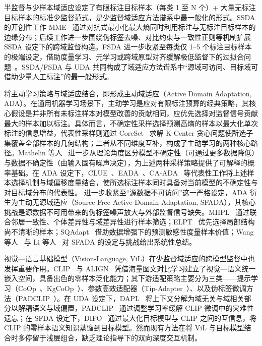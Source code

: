 半监督与少样本域适应设定了有限标注目标样本（每类 1 至 N 个）+ 大量无标注目标样本的标准少监督范式，是少监督域适应方法谱系中最一般化的形式。SSDA 的开创性工作 MME~\cite{saito2019semi} 通过对抗式最小化最大熵同时利用标注与无标注目标样本的边缘分布；后续工作进一步围绕伪标签去噪、对比约束与一致性正则等机制扩展 SSDA 设定下的跨域监督构造。FSDA 进一步收紧至每类仅 1–5 个标注目标样本的极端设定，借助度量学习、元学习或跨域原型对齐缓解极低监督下的过拟合问题~\cite{zhao2021fewshot}。SSDA/FSDA 与 UDA 共同构成了域适应方法谱系中“源域可访问、目标域可借助少量人工标注”的最一般形式。

将主动学习策略与域适应结合，即形成主动域适应（Active Domain Adaptation, ADA）。在通用机器学习场景下，主动学习是应对有限标注预算的经典策略，其核心假设是并非所有未标注样本对模型改善的贡献相同，应优先选择对监督信号贡献最大的样本加以标注。具体而言，不确定性采样选择预测高熵的样本以最大化单次标注的信息增益，代表性采样则通过 CoreSet~\cite{CoreSet1} 求解 K-Center 贪心问题使所选子集覆盖全部样本的几何结构；二者从不同维度互补，构成了主动学习的两种核心路径。Mathelin 等人~\cite{mathelin2022discrepancy} 进一步从理论角度区分模型不确定性（可通过更多数据降低）与数据不确定性（由输入固有噪声决定），为上述两种采样策略提供了可解释的概率基础。在 ADA 设定下，CLUE~\cite{prabhu2021active}、EADA~\cite{xie2022active}、CA-ADA~\cite{xiao2024category} 等代表性工作将上述样本选择机制与域偏移度量结合，使所选标注样本同时具备对当前模型的不确定性与对目标域分布的代表性。
进一步收紧至“源数据不可访问”这一严格设定，ADA 衍生为主动无源域适应（Source-Free Active Domain Adaptation, SFADA），其核心挑战是源数据不可用带来的伪标签噪声放大与外部监督信号缺失。MHPL~\cite{MHPL} 通过联合邻居一致性、个体差异性与域差异性进行样本筛选；ELPT~\cite{li2022source} 优先选择局部结构尚不清晰的样本；SQAdapt~\cite{SQAdapt} 借助数据增强下的预测敏感性度量样本价值；Wang 等人~\cite{wang2023mhpl} 与 Li 等人~\cite{li2023source} 对 SFADA 的设定与挑战给出系统性总结。

视觉—语言基础模型（Vision-Language, ViL）在少监督域适应的跨模型监督中也发挥重要作用。CLIP~\cite{radford2021learning} 与 ALIGN~\cite{jia2021scaling} 凭借海量图文对比学习建立了视觉—语义统一嵌入空间，具备出色的零样本泛化能力；其下游适配策略主要分为三类——提示学习（CoOp~\cite{zhou2022learning}、KgCoOp~\cite{kgcoop}）、参数高效适配器（Tip-Adapter~\cite{Tip-Adapter}）、以及伪标签微调方法（PADCLIP~\cite{lai2023padclip}）。在 UDA 设定下，DAPL~\cite{ge2023domain} 将上下文分解为域无关与域相关部分以解耦语义与域偏置，PADCLIP~\cite{lai2023padclip} 通过调整学习率缓解 CLIP 微调中的灾难性遗忘；在 SFDA 设定下，DIFO~\cite{tang2024source} 通过最大化目标模型与 CLIP 之间的互信息，将 CLIP 的零样本语义知识蒸馏到目标模型。然而现有方法在将 ViL 与目标模型结合时多停留于浅层组合，缺乏理论指导下的双向深度交互机制。

